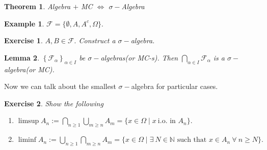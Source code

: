 \documentclass{article}
\newcommand{\1}{\mathds{1}}
\newcommand{\N}{\mathbb{N}}
\newcommand{\F}{\mathcal{F}}
\newcommand{\lf}{\left}
\newcommand{\rg}{\right}
\newcommand{\en}[3]{\lf\{{#1}_{#2}\rg\}_{#2\in #3}}
\newtheorem{theorem}{Theorem}[section]
\newtheorem{lemma}[theorem]{Lemma}
\newtheorem{example}{Example}
\newtheorem{exercise}{Exercise}
\begin{document}
\begin{theorem}
    Algebra $+$ MC $\iff$ $\sigma-$Algebra
\end{theorem}
\begin{example}
$\F=\{\emptyset,A,A^c,\Omega\}.$
\end{example}
\begin{exercise}
    $A,B\in\F.$ Construct a $\sigma-$algebra.
\end{exercise}
\begin{lemma}
    $\en{\F}\alpha I$ be $\sigma-$algebras(or MC-s). Then $\bigcap_{\alpha\in I}\F_\alpha$ is a $\sigma-$algebra(or MC).
\end{lemma}
Now we can talk about the smallest $\sigma-$algebra for particular cases.
\begin{exercise}
    Show the following
    \begin{enumerate}
        \item $\limsup A_n:=\bigcap_{n\geq 1}\bigcup_{m\geq n}A_m=\{x\in\Omega\mid x\ \text{i.o. in }A_n\}.$
        \item $\liminf A_n:=\bigcup_{n\geq 1}\bigcap_{m\geq n}A_m=\{x\in\Omega\mid \exists\ N\in\N\text{ such that }x\in A_n\ \forall\ n\geq N\}.$
    \end{enumerate}
\end{exercise}
\end{document}
